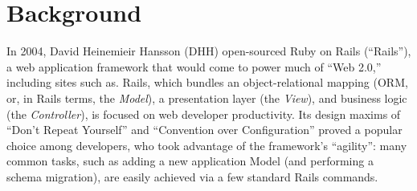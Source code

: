 
\section{Background}
\label{sec:motivation}





In 2004, David Heinemieir Hansson (DHH) open-sourced Ruby on Rails (``Rails''), a web application framework that would come to power much of ``Web 2.0,'' including sites such as. Rails, which bundles an object-relational mapping (ORM, or, in Rails terms, the \textit{Model}), a presentation layer (the \textit{View}), and business logic (the \textit{Controller}), is focused on web developer productivity. Its design maxims of ``Don't Repeat Yourself'' and ``Convention over Configuration'' proved a popular choice among developers, who took advantage of the framework's  ``agility'': many common tasks, such as adding a new application Model (and performing a schema migration), are easily achieved via a few standard Rails commands.
